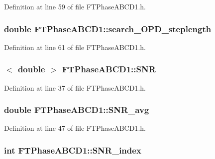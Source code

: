 Definition at line 59 of file FTPhaseABCD1.h.

\hypertarget{classFTPhaseABCD1_a96dfa4270b568d344a29313dcf36874f}{
\subsubsection[{search\_\-OPD\_\-steplength}]{\setlength{\rightskip}{0pt plus 5cm}double {\bf FTPhaseABCD1::search\_\-OPD\_\-steplength}}}
\label{classFTPhaseABCD1_a96dfa4270b568d344a29313dcf36874f}


Definition at line 61 of file FTPhaseABCD1.h.

\hypertarget{classFTPhaseABCD1_a52ef3a131cb9f9122dc5c620a18d7a35}{
\subsubsection[{SNR}]{$<$ double $>$ {\bf FTPhaseABCD1::SNR}}}
\label{classFTPhaseABCD1_a52ef3a131cb9f9122dc5c620a18d7a35}


Definition at line 37 of file FTPhaseABCD1.h.

\hypertarget{classFTPhaseABCD1_a5d45c852200065adf91b279b84c76e66}{
\subsubsection[{SNR\_\-avg}]{\setlength{\rightskip}{0pt plus 5cm}double {\bf FTPhaseABCD1::SNR\_\-avg}}}
\label{classFTPhaseABCD1_a5d45c852200065adf91b279b84c76e66}


Definition at line 47 of file FTPhaseABCD1.h.

\hypertarget{classFTPhaseABCD1_add40ff7b5cc72bbda9b9e2963c27971b}{
\subsubsection[{SNR\_\-index}]{\setlength{\rightskip}{0pt plus 5cm}int {\bf FTPhaseABCD1::SNR\_\-index}}}
\label{classFTPhaseABCD1_add40ff7b5cc72bbda9b9e2963c27971b}


